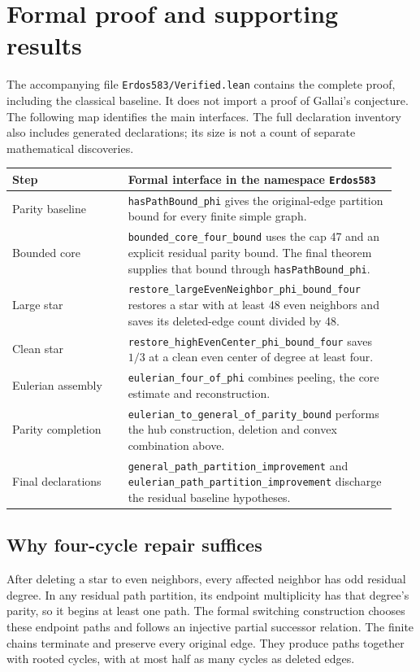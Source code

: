 \documentclass[11pt]{article}
\begin{document}
\section{Formal proof and supporting results}
The accompanying file \nolinkurl{Erdos583/Verified.lean} contains the complete proof, including the classical baseline. It does not import a proof of Gallai's conjecture. The following map identifies the main interfaces. The full declaration inventory also includes generated declarations; its size is not a count of separate mathematical discoveries.
\begin{longtable}{p{0.29\linewidth}p{0.65\linewidth}}
\toprule
Step & Formal interface in the namespace \nolinkurl{Erdos583} \\
\midrule
\endhead
Parity baseline & \nolinkurl{hasPathBound_phi} gives the original-edge partition bound for every finite simple graph. \\
Bounded core & \nolinkurl{bounded_core_four_bound} uses the cap 47 and an explicit residual parity bound. The final theorem supplies that bound through \nolinkurl{hasPathBound_phi}. \\
Large star & \nolinkurl{restore_largeEvenNeighbor_phi_bound_four} restores a star with at least 48 even neighbors and saves its deleted-edge count divided by 48. \\
Clean star & \nolinkurl{restore_highEvenCenter_phi_bound_four} saves $1/3$ at a clean even center of degree at least four. \\
Eulerian assembly & \nolinkurl{eulerian_four_of_phi} combines peeling, the core estimate and reconstruction. \\
Parity completion & \nolinkurl{eulerian_to_general_of_parity_bound} performs the hub construction, deletion and convex combination above. \\
Final declarations & \nolinkurl{general_path_partition_improvement} and \nolinkurl{eulerian_path_partition_improvement} discharge the residual baseline hypotheses. \\
\bottomrule
\end{longtable}

\subsection{Why four-cycle repair suffices}
After deleting a star to even neighbors, every affected neighbor has odd residual degree. In any residual path partition, its endpoint multiplicity has that degree's parity, so it begins at least one path. The formal switching construction chooses these endpoint paths and follows an injective partial successor relation. The finite chains terminate and preserve every original edge. They produce paths together with rooted cycles, with at most half as many cycles as deleted edges.
\end{document}
